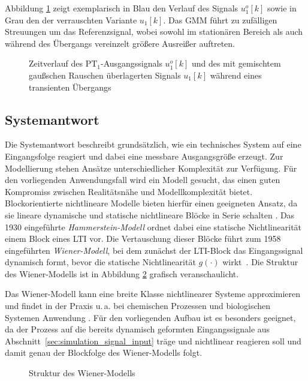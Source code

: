 %
Abbildung \ref{fig:pt1_noise} zeigt exemplarisch in Blau den Verlauf des Signals $u^o_1[k]$ sowie in Grau den der verrauschten Variante $u_1[k]$. Das \ac{GMM} führt zu zufälligen Streuungen um das Referenzsignal, wobei sowohl im stationären Bereich als auch während des Übergangs vereinzelt größere Ausreißer auftreten.
%
\begin{figure}[bt!]
    \centering
    \makebox[\textwidth][c]{%
        
    }
    \caption{Zeitverlauf des $\mathrm{PT}_1$-Ausgangssignals $u^o_1[k]$ und des mit gemischtem gaußschen Rauschen überlagerten Signals $u_1[k]$ während eines transienten Übergangs}
    \label{fig:pt1_noise}
\end{figure}
%
\subsection{Systemantwort} \label{sec:systemantwort}
%
Die Systemantwort beschreibt grundsätzlich, wie ein technisches System auf eine Eingangsfolge reagiert und dabei eine messbare Ausgangsgröße erzeugt. Zur Modellierung stehen Ansätze unterschiedlicher Komplexität zur Verfügung. Für den vorliegenden Anwendungsfall wird ein Modell gesucht, das einen guten Kompromiss zwischen Realitätsnähe und Modellkomplexität bietet. Blockorientierte nichtlineare Modelle bieten hierfür einen geeigneten Ansatz, da sie lineare dynamische und statische nichtlineare Blöcke in Serie schalten \cite{giri.2010}. Das 1930 eingeführte \emph{Hammerstein-Modell} ordnet dabei eine statische Nichtlinearität einem Block eines \ac{LTI} vor. Die Vertauschung dieser Blöcke führt zum 1958 eingeführten \emph{Wiener-Modell}, bei dem zunächst der \ac{LTI}-Block das Eingangssignal dynamisch formt, bevor die statische Nichtlinearität $g(\cdot)$ wirkt~\cite{wiener.1958, schoukens.2019}. Die Struktur des Wiener-Modells ist in Abbildung \ref{fig:wiener_modell_struktur} grafisch veranschaulicht. \par
Das Wiener-Modell kann eine breite Klasse nichtlinearer Systeme approximieren und findet in der Praxis u.\,a. bei chemischen Prozessen und biologischen Systemen Anwendung \cite{giri.2010}. Für den vorliegenden Aufbau ist es besonders geeignet, da der Prozess auf die bereits dynamisch geformten Eingangssignale aus Abschnitt~\ref{sec:simulation_signal_input} träge und nichtlinear reagieren soll und damit genau der Blockfolge des Wiener-Modells folgt. 
%
\begin{figure}[bt!]
    \centering
    
    \caption{Struktur des Wiener-Modells}
    \label{fig:wiener_modell_struktur}
\end{figure}
